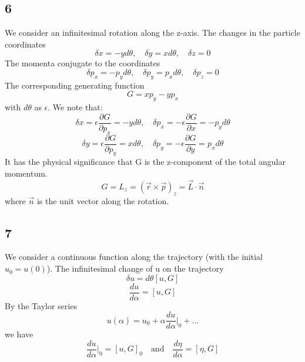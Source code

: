 \documentclass[12pt]{article}
\begin{document}
	\subsection*{6}
	We consider an infinitesimal rotation along the z-axis. The changes in the particle coordinates
	\begin{equation*}
		\delta x = -y d\theta, \quad \delta y = x d\theta, \quad \delta z = 0
	\end{equation*}
	The momenta conjugate to the coordinates
	\begin{equation*}
		\delta p_x = -p_y d\theta, \quad \delta p_y = p_x d\theta, \quad \delta p_z = 0
	\end{equation*}
	The corresponding generating function
	\begin{equation*}
		G = x p_y - y p_x
	\end{equation*}
	with $d\theta$ as $\epsilon$. We note that:
	\begin{equation*}
		\delta x = \epsilon \frac{\partial G}{\partial p_x} = -y d\theta, \quad \delta p_x = -\epsilon \frac{\partial G}{\partial x} = -p_y d\theta
	\end{equation*}
	\begin{equation*}
		\delta y = \epsilon \frac{\partial G}{\partial p_y} = x d\theta, \quad \delta p_y = -\epsilon \frac{\partial G}{\partial y} = p_x d\theta
	\end{equation*}
	It has the physical significance that G is the z-component of the total angular momentum.
	\begin{equation*}
		G = L_z = (\vec{r} \times \vec{p})_z = \vec{L} \cdot \vec{n}
	\end{equation*}
	where $\vec{n}$ is the unit vector along the rotation.
	
	\subsection*{7}
	We consider a continuous function along the trajectory (with the initial $u_0 = u(0)$).
	The infinitesimal change of u on the trajectory
	\begin{equation*}
		\delta u = d\theta [u, G]
	\end{equation*}
	\begin{equation*}
		\frac{du}{d\alpha} = [u, G]
	\end{equation*}
	By the Taylor series
	\begin{equation*}
		u(\alpha) = u_0 + \alpha \frac{du}{d\alpha}|_0 + \dots
	\end{equation*}
	we have
	\begin{equation*}
		\frac{du}{d\alpha}|_0 = [u, G]_0 \quad \text{and} \quad \frac{d\eta}{d\alpha} = [\eta, G]
	\end{equation*}
\end{document}
